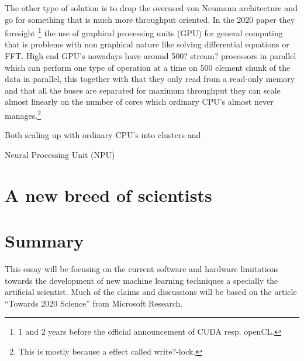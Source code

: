 \documentclass{article}
\begin{document}
    The other type of solution is to drop the overused von Neumann architecture
    and go for something that is much more throughput oriented. In the 2020
    paper\cite{ms2020} they foresight
    \footnote{1 and 2 years before the official 
    announcement of CUDA resp. openCL.} 
    the use of graphical processing units
    (GPU) for general computing that is problems with non graphical nature like
    solving differential equations or FFT. High end GPU's nowadays have around
    500? stream? processors in parallel which can perform one type of operation
    at a time on 500 element chunk of the data in parallel, this together with that they
    only read from a read-only memory and that all the buses are separated for
    maximum throughput they can scale almost linearly on the number of cores
    which ordinary CPU's almost never manages.\footnote{This is mostly because
    a effect called write?-lock.}

    Both scaling up with ordinary CPU's into clusters and 



    Neural Processing Unit (NPU)

\section{A new breed of scientists}


\section{Summary} %

    This essay will be focusing on the current software and hardware limitations
    towards the development of new machine learning techniques a specially the
    artificial scientist. Much of the claims and discussions will be based on
    the article ``Towards 2020 Science'' from Microsoft Research.\cite{ms2020}


\end{document}
